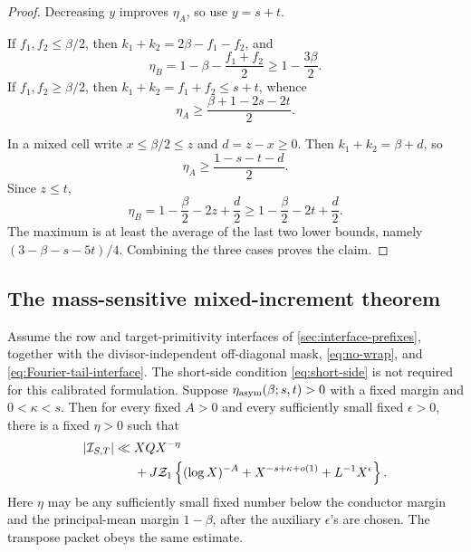 \begin{proof}
Decreasing \(y\) improves \(\eta_A\), so use \(y=s+t\).

If \(f_1,f_2\le\beta/2\), then
\(k_1+k_2=2\beta-f_1-f_2\), and
\[
 \eta_B=1-\beta-\frac{f_1+f_2}{2}
 \ge1-\frac{3\beta}{2}.
\]
If \(f_1,f_2\ge\beta/2\), then
\(k_1+k_2=f_1+f_2\le s+t\), whence
\[
 \eta_A\ge\frac{\beta+1-2s-2t}{2}.
\]

In a mixed cell write
\(x\le\beta/2\le z\) and \(d=z-x\ge0\).  Then
\(k_1+k_2=\beta+d\), so
\begin{equation}
 \eta_A\ge\frac{1-s-t-d}{2}.
 \label{eq:asym-mixed-A}
\end{equation}
Since \(z\le t\),
\begin{equation}
 \eta_B=1-\frac\beta2-2z+\frac d2
 \ge1-\frac\beta2-2t+\frac d2.
 \label{eq:asym-mixed-B}
\end{equation}
The maximum is at least the average of the last two lower bounds,
namely \((3-\beta-s-5t)/4\).  Combining the three cases proves the
claim.
\end{proof}

\subsection{The mass-sensitive mixed-increment theorem}

\begin{theorem}
\label{thm:calibrated-increment-estimate}
Assume the row and target-primitivity interfaces of
\cref{sec:interface-prefixes}, together with the divisor-independent
off-diagonal mask, \eqref{eq:no-wrap}, and
\eqref{eq:Fourier-tail-interface}.  The short-side condition
\eqref{eq:short-side} is not required for this calibrated formulation.
Suppose
\(\eta_{\rm asym}(\beta;s,t)>0\) with a fixed margin and
\(0<\kappa<s\).  Then for every fixed \(A>0\) and every sufficiently
small fixed \(\epsilon>0\), there is a fixed \(\eta>0\) such that
\begin{align}
 |\mathcal I_{S,T}|
 \ll{}&XQX^{-\eta}
 \notag\\
 &+J\mathcal Z_1\left\{
 (\log X)^{-A}+X^{-s+\kappa+o(1)}+L^{-1}X^\epsilon
 \right\}.
 \label{eq:mass-sensitive-main-theorem}
\end{align}
Here \(\eta\) may be any sufficiently small fixed number below the
conductor margin and the principal-mean margin \(1-\beta\), after the
auxiliary \(\epsilon\)'s are chosen.  The transpose packet obeys the
same estimate.
\end{theorem}

